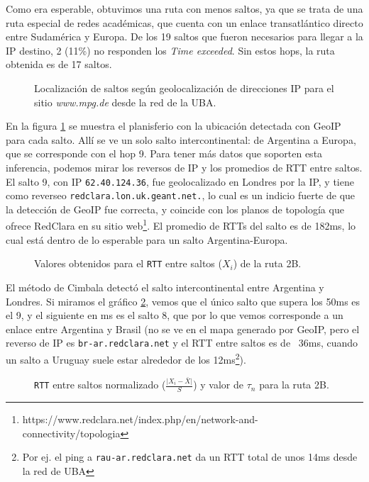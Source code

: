 Como era esperable, obtuvimos una ruta con menos saltos, ya que se trata de una ruta especial de redes académicas, que cuenta con un enlace transatlántico directo entre Sudamérica y Europa.
De los 19 saltos que fueron necesarios para llegar a la IP destino, 2 (11\%) no responden los \emph{Time exceeded}. Sin estos hops, la ruta obtenida es de 17 saltos.

\begin{figure}[H]
    \caption{Localización de saltos según geolocalización de direcciones IP para
    el sitio \emph{www.mpg.de} desde la red de la UBA.}
    \label{res:escb2:map}
\end{figure}

En la figura \ref{res:escb2:map} se muestra el planisferio con la ubicación detectada con GeoIP para cada salto. Allí se ve un solo salto intercontinental: de Argentina a Europa, que se corresponde con el hop 9. Para tener más datos que soporten esta inferencia, podemos mirar los reversos de IP y los promedios de RTT entre saltos. El salto 9, con IP \texttt{62.40.124.36}, fue geolocalizado en Londres por la IP, y tiene como reverseo \texttt{redclara.lon.uk.geant.net.}, lo cual es un indicio fuerte de que la detección de GeoIP fue correcta, y coincide con los planos de topología que ofrece RedClara en su sitio web\footnote{https://www.redclara.net/index.php/en/network-and-connectivity/topologia}. El promedio de RTTs del salto es de 182ms, lo cual está dentro de lo esperable para un salto Argentina-Europa.

\begin{figure}[H]
    \caption{Valores obtenidos para el \texttt{RTT} entre saltos ($X_i$) de la ruta 2B.}
    \label{res:escb2:rtt}
\end{figure}

El método de Cimbala detectó el salto intercontinental entre Argentina y Londres. Si miramos el gráfico \ref{res:escb2:rtt}, vemos que el único salto que supera los 50ms es el 9, y el siguiente en ms es el salto 8, que por lo que vemos corresponde a un enlace entre Argentina y Brasil (no se ve en el mapa generado por GeoIP, pero el reverso de IP es \texttt{br-ar.redclara.net} y el RTT entre saltos es de ~36ms, cuando un salto a Uruguay suele estar alrededor de los 12ms\footnote{Por ej. el ping a \texttt{rau-ar.redclara.net} da un RTT total de unos 14ms desde la red de UBA}).

\begin{figure}[H]
    \caption{\texttt{RTT} entre saltos normalizado ($\frac{\vert X_i-\bar{X}\vert}{S}$)
    y valor de $\tau_n$ para la ruta 2B.}
    \label{res:escb2:rttnorm}
\end{figure}

